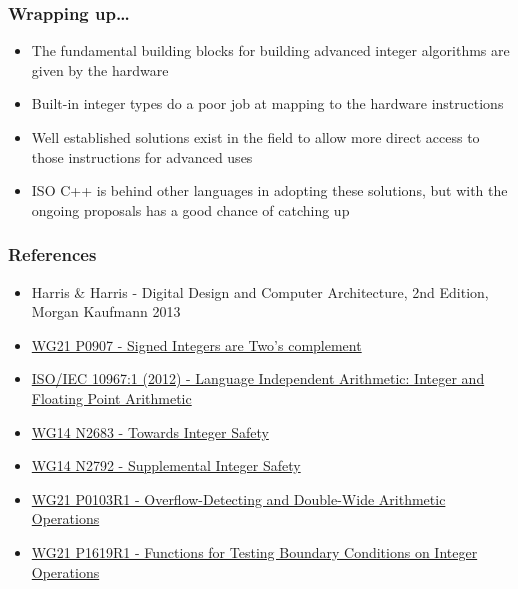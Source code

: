 \documentclass[aspectratio=169]{beamer}
\begin{document}
\begin{frame}
  \frametitle{Wrapping up\ldots}

  \begin{itemize}
  \item The fundamental building blocks for building advanced integer algorithms are given by the hardware
  \item Built-in integer types do a poor job at mapping to the hardware instructions
  \item Well established solutions exist in the field to allow more direct access to those instructions for advanced uses
  \item ISO C++ is behind other languages in adopting these solutions, but with the ongoing proposals has a good chance of catching up
  \end{itemize}
\end{frame}


\begin{frame}
\frametitle{References}

\begin{itemize}
  \item Harris \& Harris - Digital Design and Computer Architecture, 2nd Edition, Morgan Kaufmann 2013
  \item \href{https://www.open-std.org/jtc1/sc22/wg21/docs/papers/2018/p0907r4.html}{WG21 P0907 - Signed Integers are Two's complement}
  \item \href{http://standards.iso.org/ittf/PubliclyAvailableStandards/c051317_ISO_IEC_10967-1_2012.zip}{ISO/IEC 10967:1 (2012) - Language Independent Arithmetic: Integer and Floating Point Arithmetic}
  \item \href{https://www.open-std.org/jtc1/sc22/wg14/www/docs/n2683.pdf}{WG14 N2683 - Towards Integer Safety}
  \item \href{https://www.open-std.org/jtc1/sc22/wg14/www/docs/n2792.pdf}{WG14 N2792 - Supplemental Integer Safety}
  \item \href{https://www.open-std.org/jtc1/sc22/wg21/docs/papers/2017/p0103r1.html}{WG21 P0103R1 - Overflow-Detecting and Double-Wide Arithmetic Operations}
  \item \href{https://www.open-std.org/jtc1/sc22/wg21/docs/papers/2019/p1619r1.pdf}{WG21 P1619R1 - Functions for Testing Boundary Conditions on Integer Operations}
\end{itemize}

\end{frame}
\end{document}
